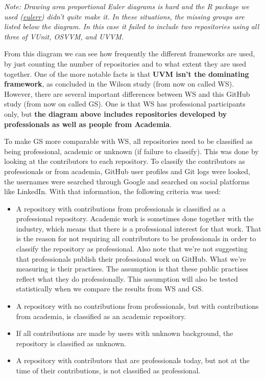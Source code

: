 \documentclass[]{article}
\providecommand{\tightlist}{%
  \setlength{\itemsep}{0pt}\setlength{\parskip}{0pt}}
\begin{document}
\emph{Note: Drawing area proportional Euler diagrams is hard and the R package we used (\href{https://cran.r-project.org/web/packages/eulerr/}{eulerr}) didn't quite make it. In these situations, the missing groups are listed below the diagram. In this case it failed to include two repositories using all three of VUnit, OSVVM, and UVVM.}

From this diagram we can see how frequently the different frameworks are used, by just counting the number of repositories and to what extent they are used together. One of the more notable facts is that \textbf{UVM isn't the dominating framework}, as concluded in the Wilson study \autocite{wilson18} (from now on called WS). However, there are several important differences between WS and this GitHub study (from now on called GS). One is that WS has professional participants only, but \textbf{the diagram above includes repositories developed by professionals as well as people from Academia}.

To make GS more comparable with WS, all repositories need to be classified as being professional, academic or unknown (if failure to classify). This was done by looking at the contributors to each repository. To classify the contributors as professionals or from academia, GitHub user profiles and Git logs were looked, the usernames were searched through Google and searched on social platforms like LinkedIn. With that information, the following criteria was used:

\begin{itemize}
\tightlist
\item
  A repository with contributions from professionals is classified as a professional repository. Academic work is sometimes done together with the industry, which means that there is a professional interest for that work. That is the reason for not requiring all contributors to be professionals in order to classify the repository as professional. Also note that we're not suggesting that professionals publish their professional work on GitHub. What we're measuring is their practises. The assumption is that these public practises reflect what they do professionally. This assumption will also be tested statistically when we compare the results from WS and GS.
\item
  A repository with no contributions from professionals, but with contributions from academia, is classified as an academic repository.
\item
  If all contributions are made by users with unknown background, the repository is classified as unknown.
\item
  A repository with contributors that are professionals today, but not at the time of their contributions, is not classified as professional.
\end{itemize}
\end{document}
